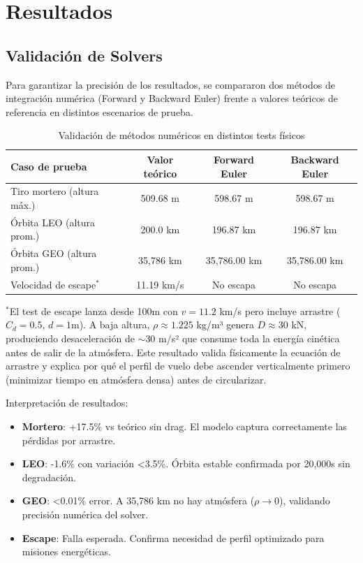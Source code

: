 \documentclass[10pt,a4paper]{article}
\begin{document}
\section{Resultados}

\subsection{Validación de Solvers}
Para garantizar la precisión de los resultados, se compararon dos métodos de integración numérica (Forward y Backward Euler) frente a valores teóricos de referencia en distintos escenarios de prueba.

\begin{table}[H]
\centering
\caption{Validación de métodos numéricos en distintos tests físicos}
\label{tab:solvers}
\begin{tabular}{@{}lccc@{}}
\toprule
\textbf{Caso de prueba} & \textbf{Valor teórico} & \textbf{Forward Euler} & \textbf{Backward Euler} \\
\midrule
Tiro mortero (altura máx.) & 509.68 m & 598.67 m & 598.67 m \\
Órbita LEO (altura prom.) & 200.0 km & 196.87 km & 196.87 km \\
Órbita GEO (altura prom.) & 35,786 km & 35,786.00 km & 35,786.00 km \\
Velocidad de escape$^*$ & 11.19 km/s & No escapa & No escapa \\
\bottomrule
\end{tabular}
\end{table}

\noindent $^*$El test de escape lanza desde 100m con $v = 11.2$ km/s pero incluye arrastre ($C_d=0.5$, $d=1$m). A baja altura, $\rho \approx 1.225$ kg/m³ genera $D \approx 30$ kN, produciendo desaceleración de $\sim$30 m/s² que consume toda la energía cinética antes de salir de la atmósfera. Este resultado valida físicamente la ecuación de arrastre y explica por qué el perfil de vuelo debe ascender verticalmente primero (minimizar tiempo en atmósfera densa) antes de circularizar.

Interpretación de resultados:
\begin{itemize}
    \item \textbf{Mortero}: +17.5\% vs teórico sin drag. El modelo captura correctamente las pérdidas por arrastre.
    \item \textbf{LEO}: -1.6\% con variación <3.5\%. Órbita estable confirmada por 20,000s sin degradación.
    \item \textbf{GEO}: <0.01\% error. A 35,786 km no hay atmósfera ($\rho \to 0$), validando precisión numérica del solver.
    \item \textbf{Escape}: Falla esperada. Confirma necesidad de perfil optimizado para misiones energéticas.
\end{itemize}
\end{document}
